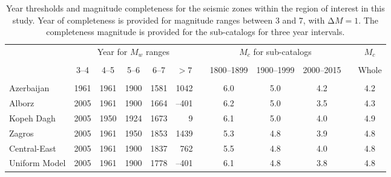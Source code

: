 \begin{table}%
    \centering
    \caption{Year thresholds and magnitude completeness for the seismic zones within the region of interest in this study. Year of completeness is provided for magnitude ranges between 3 and 7, with $\mathrm{\Delta}M = 1$. The completeness magnitude is provided for the sub-catalogs for three year intervals.}
    \begin{tabular}{lccccrcccccc}
        \cline{2-12}                                                                                  			\\[-1.6ex]
                        & \multicolumn{5}{c}{Year for $M_w$ ranges} 
                                                            & & \multicolumn{3}{c}{$M_c$ for sub-catalogs} & &$M_c$\\
        \cline{2-6} \cline{8-10}                                                                      			\\[-1.6ex]
                        & 3--4 & 4--5 & 5--6 & 6--7 & \multicolumn{1}{c}{$>7$} 
                                                            & & 1800--1899 & 1900--1999 & 2000--2015  & & Whole	\\[0.6ex]
        \hline                                                                                        			\\[-1.6ex]
        Azerbaijan      & 1961 & 1961 & 1900 & 1581 & 1042  & &     6.0    &     5.0    &     4.2     & &  4.2 	\\
        Alborz          & 2005 & 1961 & 1900 & 1664 &--401  & &     6.2    &     5.0    &     3.5     & &  4.3 	\\
        Kopeh Dagh      & 2005 & 1950 & 1924 & 1673 &    9  & &     6.1    &     5.0    &     4.0     & &  4.9 	\\
        Zagros          & 2005 & 1961 & 1950 & 1853 & 1439  & &     5.3    &     4.8    &     3.9     & &  4.8 	\\
        Central-East    & 2005 & 1961 & 1900 & 1837 &  762  & &     5.5    &     4.8    &     4.0     & &  4.8 	\\
        Uniform Model   & 2005 & 1961 & 1900 & 1778 &--401  & &     6.1    &     4.8    &     3.8     & &  4.8 	\\[0.5ex]
        \hline 
    \end{tabular}
    \label{tab:completeness} 
\end{table}

